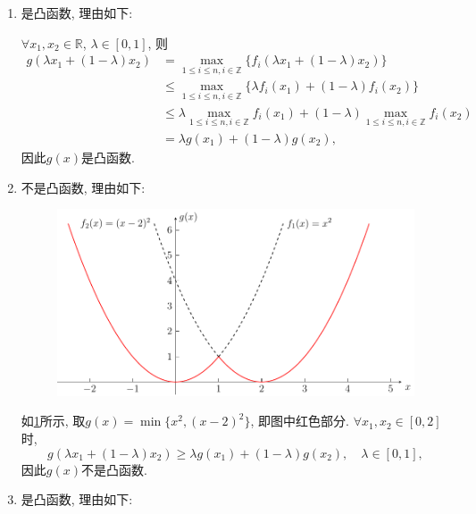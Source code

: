 \begin{enumerate}[label=\alph*)]
    \item
        是凸函数, 理由如下:

        $\forall x_1,x_2\in\mathbb{R}$, $\lambda\in[0,1]$, 则
        \begin{align*}
            g(\lambda x_1+(1-\lambda)x_2)
            &=\max_{1\leq i\leq n, i\in\mathbb{Z}}\{f_i(\lambda x_1+(1-\lambda)x_2)\} \\
            &\leq\max_{1\leq i\leq n, i\in\mathbb{Z}}\{\lambda f_i(x_1)+(1-\lambda)f_i(x_2)\} \\
            &\leq\lambda\max_{1\leq i\leq n, i\in\mathbb{Z}}f_i(x_1)+(1-\lambda)\max_{1\leq i\leq n, i\in\mathbb{Z}}f_i(x_2) \\
            &=\lambda g(x_1)+(1-\lambda)g(x_2),
        \end{align*}
        因此$g(x)$是凸函数.

    \item
        不是凸函数, 理由如下:

        \begin{figure}[ht]
            \centering
            \includegraphics[scale=0.6]{figures/3b.pdf}
            \caption{}
            \label{figure:3b}
        \end{figure}
        如\cref{figure:3b}所示, 取$g(x)=\min\{x^2,(x-2)^2\}$, 即图中红色部分.
        $\forall x_1,x_2\in[0,2]$时,
        \begin{equation*}
            g(\lambda x_1+(1-\lambda)x_2)\geq\lambda g(x_1)+(1-\lambda)g(x_2),\quad \lambda\in[0,1],
        \end{equation*}
        因此$g(x)$不是凸函数.

    \item
        是凸函数, 理由如下:


\end{enumerate}
